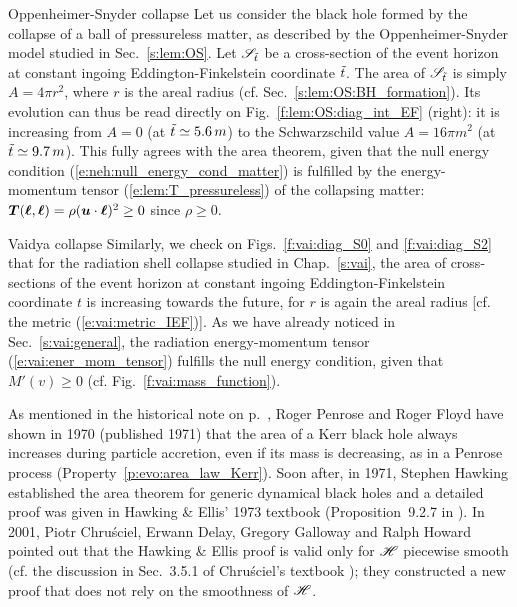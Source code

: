 \begin{texample}{Oppenheimer-Snyder collapse}{}
Let us consider the black hole formed by the collapse
of a ball of pressureless matter, as described by the Oppenheimer-Snyder
model studied in Sec.~\ref{s:lem:OS}. Let $\mathscr{S}_{{\tilde t}}$ be a
cross-section of the event horizon at constant ingoing Eddington-Finkelstein coordinate ${\tilde t}$.
The area of $\mathscr{S}_{{\tilde t}}$ is simply $A = 4\pi r^2$,
where $r$ is the areal radius (cf. Sec.~\ref{s:lem:OS:BH_formation}). Its
evolution can thus be read directly on Fig.~\ref{f:lem:OS:diag_int_EF} (right):
it is increasing from $A = 0$ (at ${\tilde t}\simeq 5.6\, m$) to the Schwarzschild
value $A = 16\pi m^2$ (at ${\tilde t}\simeq 9.7\, m$). This fully agrees
with the area theorem, given that the null energy condition (\ref{e:neh:null_energy_cond_matter})
is fulfilled by the energy-momentum tensor (\ref{e:lem:T_pressureless}) of the collapsing matter: $\bm{T}(\bm{\ell},\bm{\ell}) =  \rho (\bm{u}\cdot\bm{\ell})^2 \geq 0$ since $\rho \geq 0$.
\end{texample}

\begin{texample}{Vaidya collapse}{}
Similarly, we check on Figs.~\ref{f:vai:diag_S0} and \ref{f:vai:diag_S2}
that for the radiation shell collapse studied in Chap.~\ref{s:vai},
the area of cross-sections of the event horizon
at constant ingoing Eddington-Finkelstein coordinate $t$
is increasing towards the future, for $r$ is again the areal radius
[cf. the metric (\ref{e:vai:metric_IEF})]. As we have already noticed in
Sec.~\ref{s:vai:general}, the radiation energy-momentum tensor (\ref{e:vai:ener_mom_tensor})
fulfills the null energy condition, given that $M'(v) \geq 0$ (cf. Fig.~\ref{f:vai:mass_function}).
\end{texample}


\begin{hist} \label{h:evo:area_increase}
As mentioned in the historical note on p.~\pageref{h:evo:irreducible_mass},
Roger Penrose
and Roger Floyd \cite{PenroF71}
have shown in 1970 (published 1971)
that the area of a Kerr black hole always increases during particle accretion,
even if its mass is decreasing, as in a Penrose process (Property~\ref{p:evo:area_law_Kerr}).
Soon after, in 1971, Stephen Hawking
\cite{Hawki71} established the area theorem for generic
dynamical black holes and a detailed proof was given in
Hawking \& Ellis' 1973 textbook (Proposition~9.2.7 in \cite{HawkiE73}).
In 2001, Piotr Chru\'sciel,
Erwann Delay,
Gregory Galloway and Ralph Howard
\cite{ChrusDGH01} pointed out that the Hawking \& Ellis proof is
valid only for $\mathscr{H}$ piecewise smooth (cf. the
discussion in Sec.~3.5.1 of Chru\'sciel's textbook \cite{Chrus20}); they constructed
a new proof that does not rely on the smoothness of $\mathscr{H}$.
\end{hist}

